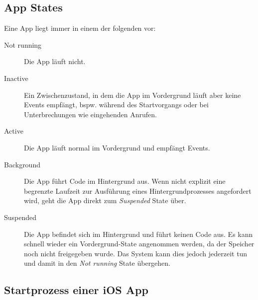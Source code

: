\documentclass[parskip=half, final]{scrreprt}
\begin{document}
\subsection{App States}\label{sec:app_states}

Eine App liegt immer in einem der folgenden  vor:

\begin{description}
\item[Not running] Die App läuft nicht.
\item[Inactive] Ein Zwischenzustand, in dem die App im Vordergrund läuft aber keine Events empfängt, bspw. während des Startvorgangs oder bei Unterbrechungen wie eingehenden Anrufen.
\item[Active] Die App läuft normal im Vordergrund und empfängt Events.
\item[Background] Die App führt Code im Hintergrund aus. Wenn nicht explizit eine begrenzte Laufzeit zur Ausführung eines Hintergrundprozesses angefordert wird, geht die App direkt zum \emph{Suspended} State über.
\item [Suspended] Die App befindet sich im Hintergrund und führt keinen Code aus. Es kann schnell wieder ein Vordergrund-State angenommen werden, da der Speicher noch nicht freigegeben wurde. Das System kann dies jedoch jederzeit tun und damit in den \emph{Not running} State übergehen.
\end{description}

\subsection{Startprozess einer iOS App}\label{sec:launchprocess}
\end{document}
